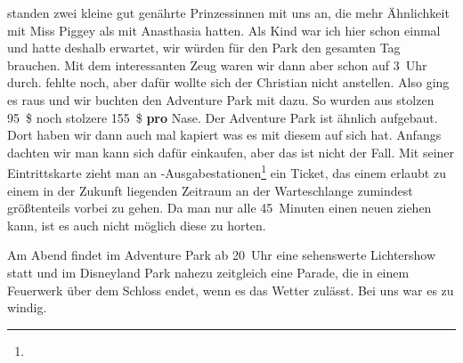 \noindent
{} standen zwei kleine gut genährte Prinzessinnen mit uns an, die mehr Ähnlichkeit mit Miss Piggey als mit Anasthasia hatten. 
Als Kind war ich hier schon einmal und hatte deshalb erwartet, wir würden für den Park den gesamten Tag brauchen.
Mit dem interessanten Zeug waren wir dann aber schon auf 3~Uhr durch.
 fehlte noch, aber dafür wollte sich der Christian nicht anstellen.
Also ging es raus und wir buchten den Adventure Park mit dazu.
So wurden aus stolzen 95~\$ noch stolzere 155~\$ \textbf{pro} Nase.
Der Adventure Park ist ähnlich aufgebaut.
Dort haben wir dann auch mal kapiert was es mit diesem  auf sich hat.
Anfangs dachten wir man kann sich dafür einkaufen, aber das ist nicht der Fall.
Mit seiner Eintrittskarte zieht man an -Ausgabestationen\footnote{} ein Ticket, das einem erlaubt zu einem in der Zukunft liegenden Zeitraum an der Warteschlange zumindest größtenteils vorbei zu gehen.
Da man nur alle 45~Minuten einen neuen  ziehen kann, ist es auch nicht möglich diese zu horten.

Am Abend findet im Adventure Park ab 20~Uhr eine sehenswerte Lichtershow  statt und im Disneyland Park nahezu zeitgleich eine Parade, die in einem Feuerwerk über dem Schloss endet, wenn es das Wetter zulässt.
Bei uns war es zu windig.

